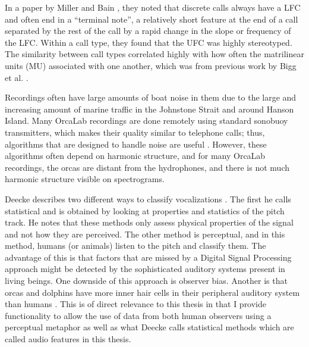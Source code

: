 \documentclass[12pt,oneside]{book}
\begin{document}
In a paper by Miller and Bain \cite{miller2000variation}, they noted
that discrete calls always have a LFC and often end in a ``terminal
note'', a relatively short feature at the end of a call separated by
the rest of the call by a rapid change in the slope or frequency of
the LFC.  Within a call type, they found that the UFC was highly
stereotyped.  The similarity between call types correlated highly with
how often the matrilinear units (MU) associated with one another,
which was from previous work by Bigg et al. \cite{bigg1990orca}.

Recordings often have large amounts of boat noise in them due to the
large and increasing amount of marine traffic in the Johnstone
Strait and around Hanson Island.  Many OrcaLab recordings are done
remotely using standard sonobuoy transmitters, which makes their quality
similar to telephone calls; thus, algorithms that are designed to
handle noise are useful \cite{wang2000pitch}.  However, these
algorithms often depend on harmonic structure, and for many OrcaLab
recordings, the orcas are distant from the hydrophones, and there is
not much harmonic structure visible on spectrograms.

Deecke describes two different ways to classify vocalizations
\cite{deecke1999quantifying}.  The first he calls statistical and is
obtained by looking at properties and statistics of the pitch track.
He notes that these methods only assess physical properties of the
signal and not how they are perceived.  The other method is
perceptual, and in this method, humans (or animals) listen to the
pitch and classify them.  The advantage of this is that factors that
are missed by a Digital Signal Processing approach might be detected
by the sophisticated auditory systems present in living beings.  One
downside of this approach is observer bias.  Another is that orcas and
dolphins have more inner hair cells in their peripheral auditory
system than humans \cite{au2000hearing}.  This is of direct relevance
to this thesis in that I provide functionality to allow the use of
data from both human observers using a perceptual metaphor as well as
what Deecke calls statistical methods which are called audio features
in this thesis.
\end{document}
